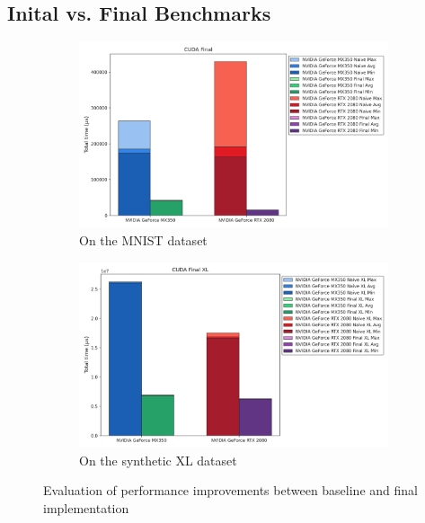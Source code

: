 \documentclass[modern,longauthor]{aastex7}
\begin{document}
\subsection{Inital vs. Final Benchmarks}
\begin{figure}[htb!]
\centering
\begin{subfigure}{.5\textwidth}
  \centering
  \includegraphics[width=\linewidth]{CUDA/CUDA_initial_vs_final.png}
  \caption{On the MNIST dataset}
\end{subfigure}%
\begin{subfigure}{.5\textwidth}
  \centering
  \includegraphics[width=\linewidth]{CUDA/CUDA XL_initial_vs_final.png}
  \caption{On the synthetic XL dataset}
\end{subfigure}
\caption{Evaluation of performance improvements between baseline and final implementation}
\label{fig:cuda-initial-vs-final-bechmarks}
\end{figure}
\end{document}
